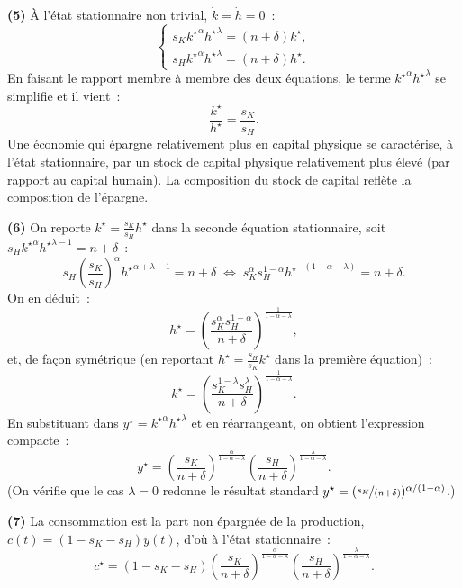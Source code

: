 \documentclass[11pt,a4paper,notitlepage]{article}
\begin{document}
\textbf{(5)} À l'état stationnaire non trivial, $\dot k=\dot h=0$~:
\[
\begin{cases}
s_K\left.k^{\star}\right.^{\alpha}\left.h^{\star}\right.^{\lambda} = (n+\delta)k^{\star},\\[2pt]
s_H\left.k^{\star}\right.^{\alpha}\left.h^{\star}\right.^{\lambda} = (n+\delta)h^{\star}.
\end{cases}
\]
En faisant le rapport membre à membre des deux équations, le terme
$\left.k^{\star}\right.^{\alpha}\left.h^{\star}\right.^{\lambda}$ se
simplifie et il vient~:
\[
\frac{k^{\star}}{h^{\star}} = \frac{s_K}{s_H}.
\]
Une économie qui épargne relativement plus en capital physique se
caractérise, à l'état stationnaire, par un stock de capital physique
relativement plus élevé (par rapport au capital humain). La
composition du stock de capital reflète la composition de l'épargne.

\textbf{(6)} On reporte $k^{\star}=\frac{s_K}{s_H}h^{\star}$ dans la
seconde équation stationnaire, soit
$s_H\left.k^{\star}\right.^{\alpha}\left.h^{\star}\right.^{\lambda-1}=n+\delta$~:
\[
s_H\left(\frac{s_K}{s_H}\right)^{\alpha}\left.h^{\star}\right.^{\alpha+\lambda-1}=n+\delta
\;\Longleftrightarrow\;
s_K^{\alpha}s_H^{1-\alpha}\left.h^{\star}\right.^{-(1-\alpha-\lambda)}=n+\delta.
\]
On en déduit~:
\[
h^{\star} = \left(\frac{s_K^{\alpha}s_H^{1-\alpha}}{n+\delta}\right)^{\frac{1}{1-\alpha-\lambda}},
\]
et, de façon symétrique (en reportant
$h^{\star}=\frac{s_H}{s_K}k^{\star}$ dans la première équation)~:
\[
k^{\star} = \left(\frac{s_K^{1-\lambda}s_H^{\lambda}}{n+\delta}\right)^{\frac{1}{1-\alpha-\lambda}}.
\]
En substituant dans $y^{\star}=\left.k^{\star}\right.^{\alpha}\left.h^{\star}\right.^{\lambda}$
et en réarrangeant, on obtient l'expression compacte~:
\[
y^{\star} = \left(\frac{s_K}{n+\delta}\right)^{\frac{\alpha}{1-\alpha-\lambda}}
            \left(\frac{s_H}{n+\delta}\right)^{\frac{\lambda}{1-\alpha-\lambda}}.
\]
(On vérifie que le cas $\lambda=0$ redonne le résultat standard
$y^{\star}=(\nicefrac{s_K}{(n+\delta)})^{\alpha/(1-\alpha)}$.)

\textbf{(7)} La consommation est la part non épargnée de la
production, $c(t)=(1-s_K-s_H)y(t)$, d'où à l'état stationnaire~:
\[
c^{\star} = (1-s_K-s_H)\left(\frac{s_K}{n+\delta}\right)^{\frac{\alpha}{1-\alpha-\lambda}}
            \left(\frac{s_H}{n+\delta}\right)^{\frac{\lambda}{1-\alpha-\lambda}}.
\]
\end{document}
